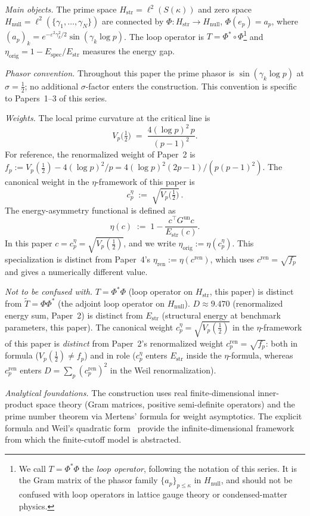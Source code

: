 \documentclass[11pt]{article}
\newcommand{\Hstr}{H_{\mathrm{str}}}
\newcommand{\Hnull}{H_{\mathrm{null}}}
\newcommand{\Estr}{E_{\mathrm{str}}}
\newcommand{\Espec}{E_{\mathrm{spec}}}
\newcommand{\etaorig}{\eta_{\mathrm{orig}}}
\newcommand{\cren}{c_p^{\mathrm{ren}}}
\newcommand{\ceta}{c_p^{\eta}}
\newcommand{\fp}{f_p}
\begin{document}
\medskip
\emph{Main objects.}
The prime space $\Hstr=\ell^2(S(\kappa))$ and zero space
$\Hnull=\ell^2(\{\gamma_1,\ldots,\gamma_N\})$ are connected by
$\Phi\colon\Hstr\to\Hnull$, $\Phi(e_p)=a_p$, where
$(a_p)_k=e^{-\varepsilon^2\gamma_k^2/2}\sin(\gamma_k\log p)$.
The loop operator is $T=\Phi^*\circ\Phi$\footnote{We call $T=\Phi^*\Phi$
the \emph{loop operator}, following the notation of this series. It is the
Gram matrix of the phasor family $\{a_p\}_{p\le\kappa}$ in
$H_{\mathrm{null}}$, and should not be confused with loop operators in
lattice gauge theory or condensed-matter physics.} and
$\etaorig=1-\Espec/\Estr$ measures the energy gap.

\medskip
\emph{Phasor convention.}
Throughout this paper the prime phasor is
$\sin(\gamma_k\log p)$ at $\sigma=\tfrac12$;
no additional $\sigma$-factor enters the construction.
This convention is specific to Papers~1--3 of this series.

\medskip
\emph{Weights.}
The local prime curvature at the critical line is
\[
  V_p\!\bigl(\tfrac12\bigr) \;=\; \frac{4(\log p)^2\,p}{(p-1)^2}.
\]
For reference, the renormalized weight of Paper~2 is
$f_p := V_p(\tfrac12) - 4(\log p)^2/p = 4(\log p)^2(2p-1)/(p(p-1)^2)$.
The canonical weight in the $\eta$-framework of this paper is
\[
  \ceta \;:=\; \sqrt{V_p\!\bigl(\tfrac12\bigr)}\,.
\]
The energy-asymmetry functional is defined as
\[
  \eta(c) \;:=\; 1 - \frac{c^\top G^{\mathrm{un}} c}{E_{\mathrm{str}}(c)}.
\]
In this paper $c = \ceta = \sqrt{V_p(\tfrac12)}$,
and we write $\etaorig := \eta(\ceta)$.
This specialization is distinct from Paper~4's $\eta_{\mathrm{ren}} := \eta(c^{\mathrm{ren}})$,
which uses $c^{\mathrm{ren}} = \sqrt{f_p}$ and gives a numerically different value.

\medskip
\emph{Not to be confused with.}
$T=\Phi^*\Phi$ (loop operator on $\Hstr$, this paper) is distinct from
$\tilde T=\Phi\Phi^*$ (the adjoint loop operator on $\Hnull$).
$D\approx 9.470$ (renormalized energy sum, Paper~2) is distinct from
$\Estr$ (structural energy at benchmark parameters, this paper).
The canonical weight $\ceta = \sqrt{V_p(\tfrac12)}$ in the
$\eta$-framework of this paper is \emph{distinct} from
Paper~2's renormalized weight $\cren = \sqrt{\fp}$:
both in formula ($V_p(\tfrac12) \neq \fp$) and in role
($\ceta$ enters $\Estr$ inside the $\eta$-formula, whereas
$\cren$ enters $D=\sum_p (\cren)^2$ in the Weil renormalization).

\medskip
\emph{Analytical foundations.}
The construction uses real finite-dimensional inner-product space theory
(Gram matrices, positive semi-definite operators) and the prime number theorem
via Mertens' formula for weight asymptotics. The explicit formula and Weil's
quadratic form~\cite{Weil} provide the infinite-dimensional framework from
which the finite-cutoff model is abstracted.
\end{document}
